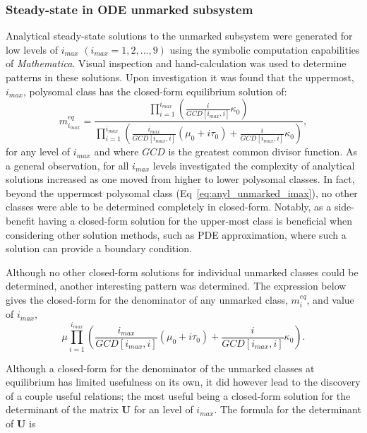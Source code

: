 \documentclass[review]{elsarticle}
\let\bs\boldsymbol
\begin{document}
\subsubsection{Steady-state in ODE unmarked subsystem}
Analytical steady-state solutions to the unmarked subsystem were generated for low levels of $i_{max}$ $(i_{max}=1,2,...,9)$ using the symbolic computation capabilities of \emph{Mathematica}.
Visual inspection and hand-calculation was used to determine patterns in these solutions.
Upon investigation it was found that the uppermost, $i_{max}$, polysomal class has the closed-form equilibrium solution of:
\begin{equation}\label{eq:anyl_unmarked_imax}
m_{i_{max}}^{eq}=\dfrac{\prod_{i=1}^{i_{max}}\left(\frac{i}{GCD[i_{max},i]}\kappa_0\right)}{\prod_{i=1}^{i_{max}}\left(\frac{i_{max}}{GCD[i_{max},i]}(\mu_0+i\tau_0)+\frac{i}{GCD[i_{max},i]}\kappa_0\right)},
\end{equation}
for any level of $i_{max}$ and where $GCD$ is the greatest common divisor function.
As a general observation, for all $i_{max}$ levels investigated the complexity of analytical solutions increased as one moved from higher to lower polysomal classes.
In fact, beyond the uppermost polysomal class (Eq~\ref{eq:anyl_unmarked_imax}), no other classes were able to be determined completely in closed-form.
Notably, as a side-benefit having a closed-form solution for the upper-most class is beneficial when considering other solution methods, such as PDE approximation, where such a solution can provide a boundary condition.

Although no other closed-form solutions for individual unmarked classes could be determined, another interesting pattern was determined.
The expression below gives the closed-form for the denominator of any unmarked class, $m_i^{eq}$, and value of $i_{max}$,
\begin{equation*}\label{eq:anyl_unmarked_denom}
\mu\prod_{i=1}^{i_{max}}\left(\frac{i_{max}}{GCD[i_{max},i]}(\mu_0+i\tau_0)+\frac{i}{GCD[i_{max},i]}\kappa_0\right).
\end{equation*}

Although a closed-form for the denominator of the unmarked classes at equilibrium has limited usefulness on its own, it did however lead to the discovery of a couple useful relations; the most useful being a closed-form solution for the determinant of the matrix $\bs{U}$ for an level of $i_{max}$.
The formula for the determinant of $\bs{U}$ is
\end{document}
